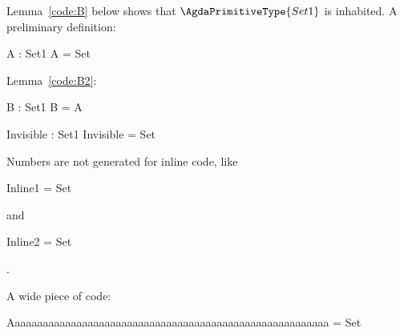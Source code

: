 \documentclass[draft]{article}
\begin{document}
Lemma~\ref{code:B} below shows that $\AgdaPrimitiveType{Set1}$ is inhabited.
%
A preliminary definition:
%
\begin{code}[number]
  A : Set1
  A = Set
\end{code}
%
Lemma~\ref{code:B2}:
%
\begin{code}[number=code:B,number=code:B2]
  B : Set1
  B = A
\end{code}

\begin{code}[hide,number=code:Invisible]
  Invisible : Set1
  Invisible = Set
\end{code}

Numbers are not generated for inline code, like
%
\begin{code}[inline*,number=code:Inline1]
  Inline1 = Set
\end{code}
%
and
%
\begin{code}[inline,number=code:Inline2]
  Inline2 = Set
\end{code}.

A wide piece of code:
%
\begin{code}[number]
  Aaaaaaaaaaaaaaaaaaaaaaaaaaaaaaaaaaaaaaaaaaaaaaaaaaaaaaaaa = Set
\end{code}
\end{document}
